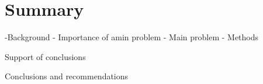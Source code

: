 \section*{Summary}\label{cha:summary}
-Background
- Importance of amin problem
- Main problem
- Methods

Support of conclusions

Conclusions and recommendations

